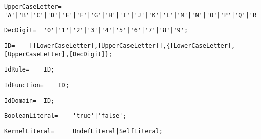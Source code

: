 \documentclass{article}
\begin{document}
    \begin{flushleft}
    \begin{lstlisting}[mathescape=true, breaklines=true]
     UpperCaseLetter= 	'A'|'B'|'C'|'D'|'E'|'F'|'G'|'H'|'I'|'J'|'K'|'L'|'M'|'N'|'O'|'P'|'Q'|'R'|'S'|'T'|'U'|'V'|'W'|'X'|'Y'|'Z';
    \end{lstlisting}
    \end{flushleft}
    \begin{flushleft}
    \begin{lstlisting}[mathescape=true, breaklines=true]
     DecDigit= 	'0'|'1'|'2'|'3'|'4'|'5'|'6'|'7'|'8'|'9';
    \end{lstlisting}
    \end{flushleft}
    \begin{flushleft}
    \begin{lstlisting}[mathescape=true, breaklines=true]
     ID= 	[[LowerCaseLetter],[UpperCaseLetter]],{[LowerCaseLetter],[UpperCaseLetter],[DecDigit]};
    \end{lstlisting}
    \end{flushleft}
    \begin{flushleft}
    \begin{lstlisting}[mathescape=true, breaklines=true]
     IdRule= 	ID;
    \end{lstlisting}
    \end{flushleft}
    \begin{flushleft}
    \begin{lstlisting}[mathescape=true, breaklines=true]
     IdFunction= 	ID;
    \end{lstlisting}
    \end{flushleft}
    \begin{flushleft}
    \begin{lstlisting}[mathescape=true, breaklines=true]
     IdDomain= 	ID;
    \end{lstlisting}
    \end{flushleft}
    \begin{flushleft}
    \begin{lstlisting}[mathescape=true, breaklines=true]
     BooleanLiteral= 	'true'|'false';
    \end{lstlisting}
    \end{flushleft}
    \begin{flushleft}
    \begin{lstlisting}[mathescape=true, breaklines=true]
     KernelLiteral= 	UndefLiteral|SelfLiteral;
    \end{lstlisting}
    \end{flushleft}
\end{document}
